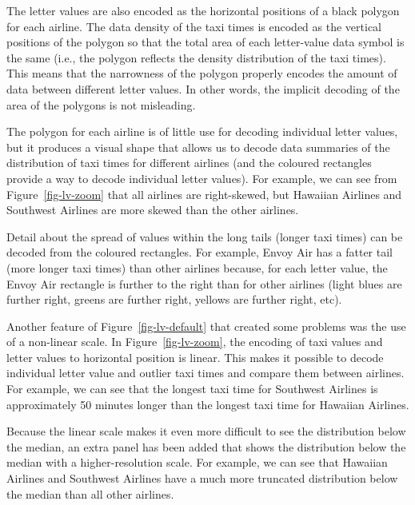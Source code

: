 \documentclass[
  letterpaper,
  DIV=11,
  numbers=noendperiod]{scrreprt}
\providecommand{\tightlist}{%
  \setlength{\itemsep}{0pt}\setlength{\parskip}{0pt}}
\begin{document}
\begin{description}
\tightlist
\item[Visual shapes]
The letter values are also encoded as the horizontal positions of a
black polygon for each airline. The data density of the taxi times is
encoded as the vertical positions of the polygon so that the total area
of each letter-value data symbol is the same (i.e., the polygon reflects
the density distribution of the taxi times). This means that the
narrowness of the polygon properly encodes the amount of data between
different letter values. In other words, the implicit decoding of the
area of the polygons is not misleading.
\end{description}

The polygon for each airline is of little use for decoding individual
letter values, but it produces a visual shape that allows us to decode
data summaries of the distribution of taxi times for different airlines
(and the coloured rectangles provide a way to decode individual letter
values). For example, we can see from Figure~\ref{fig-lv-zoom} that all
airlines are right-skewed, but Hawaiian Airlines and Southwest Airlines
are more skewed than the other airlines.

Detail about the spread of values within the long tails (longer taxi
times) can be decoded from the coloured rectangles. For example, Envoy
Air has a fatter tail (more longer taxi times) than other airlines
because, for each letter value, the Envoy Air rectangle is further to
the right than for other airlines (light blues are further right, greens
are further right, yellows are further right, etc).

\begin{description}
\tightlist
\item[Non-linear scales]
Another feature of Figure~\ref{fig-lv-default} that created some
problems was the use of a non-linear scale. In Figure~\ref{fig-lv-zoom},
the encoding of taxi values and letter values to horizontal position is
linear. This makes it possible to decode individual letter value and
outlier taxi times and compare them between airlines. For example, we
can see that the longest taxi time for Southwest Airlines is
approximately 50 minutes longer than the longest taxi time for Hawaiian
Airlines.
\end{description}

Because the linear scale makes it even more difficult to see the
distribution below the median, an extra panel has been added that shows
the distribution below the median with a higher-resolution scale. For
example, we can see that Hawaiian Airlines and Southwest Airlines have a
much more truncated distribution below the median than all other
airlines.
\end{document}
